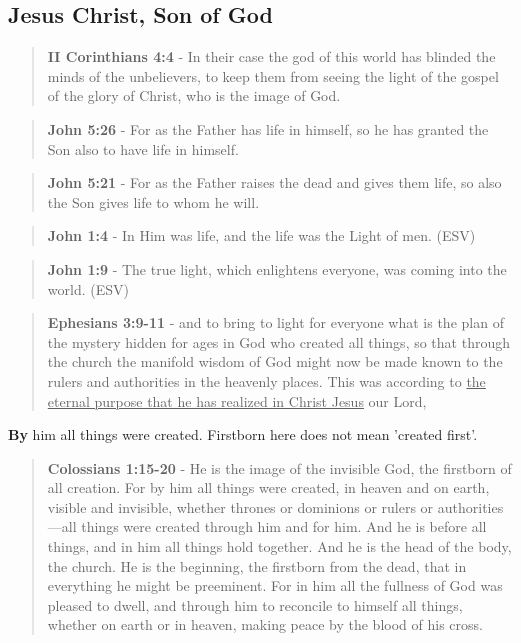 \documentclass[11pt]{article}
\begin{document}
\subsection{Jesus Christ, Son of God}
\label{sec:org3cb8e81}
\begin{quote}
\textbf{II Corinthians 4:4} - In their case the god of this world has blinded the minds of the unbelievers, to keep them from seeing the light of the gospel of the glory of Christ, who is the image of God.
\end{quote}

\begin{quote}
\textbf{John 5:26} - For as the Father has life in himself, so he has granted the Son also to have life in himself.
\end{quote}

\begin{quote}
\textbf{John 5:21} - For as the Father raises the dead and gives them life, so also the Son gives life to whom he will.
\end{quote}

\begin{quote}
\textbf{John 1:4} - In Him was life, and the life was the Light of men. (ESV)
\end{quote}

\begin{quote}
\textbf{John 1:9} - The true light, which enlightens everyone, was coming into the world. (ESV)
\end{quote}

\begin{quote}
\textbf{Ephesians 3:9-11} - and to bring to light for everyone what is the plan of the mystery hidden for ages in God who created all things, so that through the church the manifold wisdom of God might now be made known to the rulers and authorities in the heavenly places. This was according to \uline{the eternal purpose that he has realized in Christ Jesus} our Lord,
\end{quote}

\textbf{By} him all things were created. Firstborn here does not mean 'created first'.

\begin{quote}
\textbf{Colossians 1:15-20} - He is the image of the invisible God, the firstborn of all creation. For by him all things were created, in heaven and on earth, visible and invisible, whether thrones or dominions or rulers or authorities—all things were created through him and for him. And he is before all things, and in him all things hold together. And he is the head of the body, the church. He is the beginning, the firstborn from the dead, that in everything he might be preeminent. For in him all the fullness of God was pleased to dwell, and through him to reconcile to himself all things, whether on earth or in heaven, making peace by the blood of his cross.
\end{quote}
\end{document}
